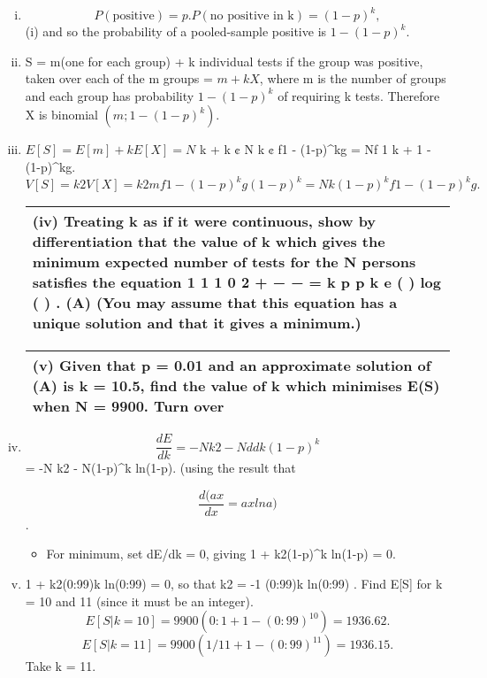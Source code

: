 \documentclass[a4paper,12pt]{article}
\begin{document}
\begin{enumerate}[(i)]
\item \[P(\mbox{positive})= p. P(\mbox{no positive in k})= (1-p)^k,\]
(i) and so the probability of a pooled-sample positive is $1 - (1-p)^k$.
\item S = m(one for each group) + k individual tests if the group was positive,
taken over each of the m groups = $m+kX$, where m is the number of groups
and each group has probability $1 - (1-p)^k$ of requiring k tests.
Therefore X is binomial $(m; 1 - (1-p)^k)$.

\item $E[S] = E[m] + kE[X] = N$
k + k ¢ N
k ¢ f1 - (1-p)^kg = Nf 1
k + 1 - (1-p)^kg.
\[V [S] = k2V [X] = k2mf1 - (1-p)^kg(1-p)^k = Nk(1-p)^kf1 - (1-p)^kg.\]
  \begin{table}[ht!]
     \centering
     \begin{tabular}{|p{15cm}|}
     \hline  
(iv) Treating k as if it were continuous, show by differentiation that the value of k which gives the minimum expected number of tests for the N persons satisfies the equation
1 1 1 0 2 + − − = k p p k e ( ) log ( ) . (A)
(You may assume that this equation has a unique solution and that it gives a minimum.)
\\ \hline
      \end{tabular}
    \end{table}

  \begin{table}[ht!]
     \centering
     \begin{tabular}{|p{15cm}|}
     \hline  
(v) Given that p = 0.01 and an approximate solution of (A) is k = 10.5, find the value of k which minimises E(S) when N = 9900.
Turn over\\ \hline
      \end{tabular}
    \end{table}
\item 
\[ \frac{dE}{dk}
 = -N
k2 - N d
dk (1-p)^k \]= -N
k2 - N(1-p)^k ln(1-p).
(using the result that

\[ \frac{d(ax}{dx} = ax ln a)\].
\begin{itemize}
\item For minimum, set dE/dk = 0, giving 1 + k2(1-p)^k ln(1-p) = 0.
\end{itemize}
\item 1 + k2(0:99)k ln(0:99) = 0, so that k2 = -1
(0:99)k ln(0:99) .
Find E[S] for k = 10 and 11 (since it must be an integer).
\[E[S|k = 10] = 9900(0:1 + 1 - (0:99)^{10}) = 1936.62.\]
\[E[S|k = 11] = 9900( 1/11 + 1 - (0:99)^{11}) = 1936.15.\]
Take k = 11.
\end{enumerate}
\end{document}
